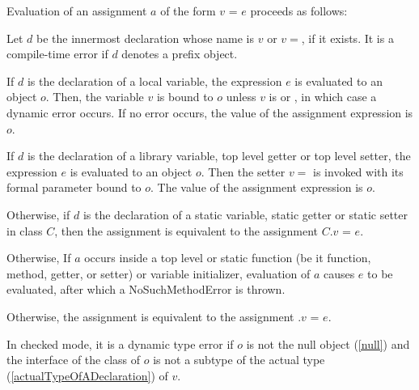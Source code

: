 \documentclass{article}
\newcommand{\code}[1]{{\sf #1}}
\begin{document}
\LMHash{}
Evaluation of an assignment $a$ of the form $v$ \code{=} $e$ proceeds as follows:




\LMHash{}
Let $d$ be the innermost declaration whose name is $v$ or $v=$, if it exists.
It is a compile-time error if $d$ denotes a prefix object.

\LMHash{}
If $d$ is the declaration of a local variable, the expression $e$ is evaluated to an object $o$. Then, the variable $v$ is bound to $o$ unless $v$ is \FINAL{} or \CONST{}, in which case a dynamic error occurs.
If no error occurs, the value of the assignment expression is $o$.


\LMHash{}
If $d$ is the declaration of a library variable, top level getter or top level setter, the expression $e$ is evaluated to an object $o$. Then the setter $v=$ is invoked with its formal parameter bound to $o$. The value of the assignment expression is $o$.

\LMHash{}
Otherwise, if $d$ is the declaration of a static variable, static getter or static setter in class $C$, then the assignment is equivalent to the assignment \code{$C.v$ = $e$}.

\LMHash{}
Otherwise, If  $a$ occurs inside a top level or static function (be it function, method, getter,  or setter) or variable initializer, evaluation of $a$ causes $e$ to be evaluated, after which a \code{NoSuchMethodError} is thrown.

\LMHash{}
Otherwise, the assignment is equivalent to the assignment \code{ \THIS{}.$v$ = $e$}.

\LMHash{}
In checked mode, it is a dynamic type error if $o$ is not the null object (\ref{null}) and the interface of the class of $o$ is not a subtype of the actual type (\ref{actualTypeOfADeclaration}) of $v$.
\end{document}
